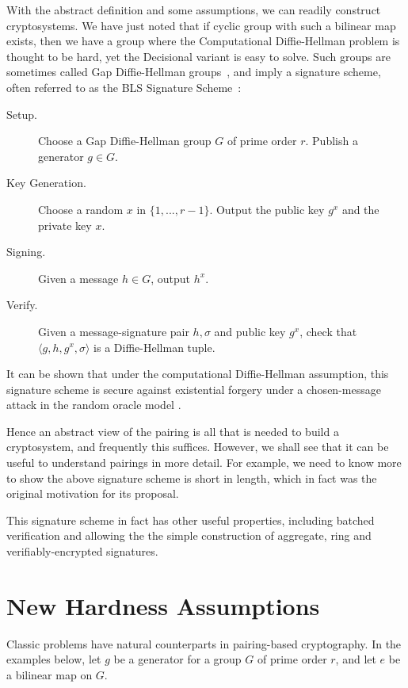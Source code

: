 With the abstract definition and some assumptions,
we can readily construct cryptosystems.
We have just noted that if cyclic group with such a
bilinear map exists, then we have a group where the Computational
Diffie-Hellman
problem is thought to be hard, yet the Decisional variant is easy to solve.
Such groups are sometimes called Gap Diffie-Hellman groups~\cite{op}, and
imply a signature scheme,
often referred to as the BLS Signature Scheme~\cite{bls}:

\begin{description}
\item[Setup.]
Choose a Gap Diffie-Hellman group $G$ of prime order $r$.
Publish a generator $g \in G$.

\item[Key Generation.]
Choose a random $x$ in $\{1,...,r-1\}$. Output
the public key $g^x$ and the private key $x$.

\item[Signing.]
Given a message $h \in G$, output $h^x$.

\item[Verify.]
Given a message-signature pair $h, \sigma$ and public key $g^x$,
check that $\langle{ g, h, g^x, \sigma}\rangle$ is a Diffie-Hellman tuple.
\end{description}

It can be shown that under the computational Diffie-Hellman assumption,
this signature scheme is secure against existential
forgery under a chosen-message attack in the random oracle model \cite{bls}.

Hence an abstract view of the pairing is all that is needed to build a
cryptosystem, and frequently this suffices. However,
we shall see that it can be useful to understand pairings in more detail.
For example, we need to know more to show the above signature scheme is
short in length, which in fact was the original motivation for its proposal.

This signature scheme in fact has other useful properties, including
batched verification and allowing the
the simple construction of aggregate, ring and verifiably-encrypted
signatures\cite{bgls}.

\section{New Hardness Assumptions}

Classic problems have natural counterparts in pairing-based
cryptography. In the examples below, let $g$ be a generator
for a group $G$ of prime order $r$, and let $e$ be a bilinear map
on $G$.

